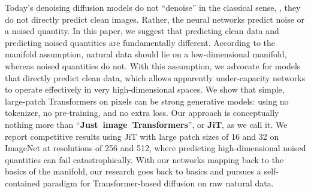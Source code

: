 Today's denoising diffusion models do not ``denoise'' in the classical sense, \ie, they do not directly predict clean images. 
Rather, the neural networks predict noise or a noised quantity.
In this paper, we suggest that predicting clean data and predicting noised quantities are fundamentally different.
According to the manifold assumption, natural data should lie on a low-dimensional manifold, whereas noised quantities do not. With this assumption, we advocate for models that directly predict clean data, which allows apparently under-capacity networks to operate effectively in very high-dimensional spaces. We show that simple, large-patch Transformers on pixels can be strong generative models: using no tokenizer, no pre-training, and no extra loss. Our approach is conceptually nothing more than ``\mbox{\textbf{Just image Transformers}}'', or \textbf{JiT}, as we call it. We report competitive results using JiT with large patch sizes of 16 and 32 on ImageNet at resolutions of 256 and 512, where predicting high-dimensional noised quantities can fail catastrophically. 
With our networks mapping back to the basics of the manifold,
our research goes back to basics and pursues a self-contained paradigm for Transformer-based diffusion on raw natural data.
